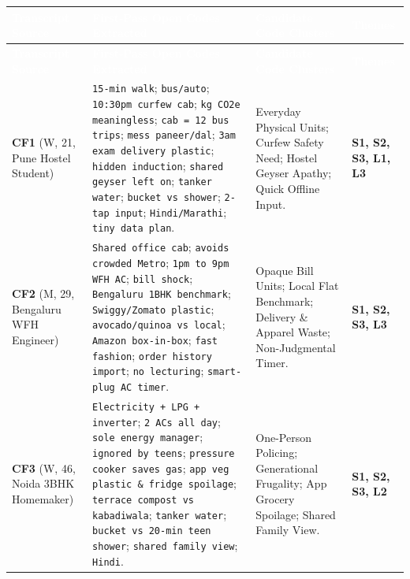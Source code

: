 \documentclass[12pt, a4paper]{article}
\begin{document}
{\footnotesize
{}
\begin{longtable}{|>{\raggedright\arraybackslash}p{3.0cm}|>{\raggedright\arraybackslash}p{7.1cm}|>{\raggedright\arraybackslash}p{3.7cm}|>{\raggedright\arraybackslash}p{1.9cm}|}
\hline
\rowcolor{cNavy}
\textcolor{white}{\textbf{Transcript Source}} & \textcolor{white}{\textbf{First-Pass Open Codes Extracted}} & \textcolor{white}{\textbf{Candidate Code Clusters}} & \textcolor{white}{\textbf{Themes}} \\
\hline
\endfirsthead
\hline
\rowcolor{cNavy}
\textcolor{white}{\textbf{Transcript Source}} & \textcolor{white}{\textbf{First-Pass Open Codes Extracted}} & \textcolor{white}{\textbf{Candidate Code Clusters}} & \textcolor{white}{\textbf{Themes}} \\
\hline
\endhead
\hline
\endfoot

\textbf{CF1} \cite{cf1} (W, 21, Pune Hostel Student) & 
\texttt{15-min walk}; \texttt{bus/auto}; \texttt{10:30pm curfew cab}; \texttt{kg CO2e meaningless}; \texttt{cab = 12 bus trips}; \texttt{mess paneer/dal}; \texttt{3am exam delivery plastic}; \texttt{hidden induction}; \texttt{shared geyser left on}; \texttt{tanker water}; \texttt{bucket vs shower}; \texttt{2-tap input}; \texttt{Hindi/Marathi}; \texttt{tiny data plan}. & 
Everyday Physical Units; Curfew Safety Need; Hostel Geyser Apathy; Quick Offline Input. & 
\textbf{S1, S2, S3, L1, L3} \\
\hline

\textbf{CF2} \cite{cf2} (M, 29, Bengaluru WFH Engineer) & 
\texttt{Shared office cab}; \texttt{avoids crowded Metro}; \texttt{1pm to 9pm WFH AC}; \texttt{bill shock}; \texttt{Bengaluru 1BHK benchmark}; \texttt{Swiggy/Zomato plastic}; \texttt{avocado/quinoa vs local}; \texttt{Amazon box-in-box}; \texttt{fast fashion}; \texttt{order history import}; \texttt{no lecturing}; \texttt{smart-plug AC timer}. & 
Opaque Bill Units; Local Flat Benchmark; Delivery \& Apparel Waste; Non-Judgmental Timer. & 
\textbf{S1, S2, S3, L3} \\
\hline

\textbf{CF3} \cite{cf3} (W, 46, Noida 3BHK Homemaker) & 
\texttt{Electricity + LPG + inverter}; \texttt{2 ACs all day}; \texttt{sole energy manager}; \texttt{ignored by teens}; \texttt{pressure cooker saves gas}; \texttt{app veg plastic \& fridge spoilage}; \texttt{terrace compost vs kabadiwala}; \texttt{tanker water}; \texttt{bucket vs 20-min teen shower}; \texttt{shared family view}; \texttt{Hindi}. & 
One-Person Policing; Generational Frugality; App Grocery Spoilage; Shared Family View. & 
\textbf{S1, S2, S3, L2} \\
\hline


\end{longtable}}
\end{document}
